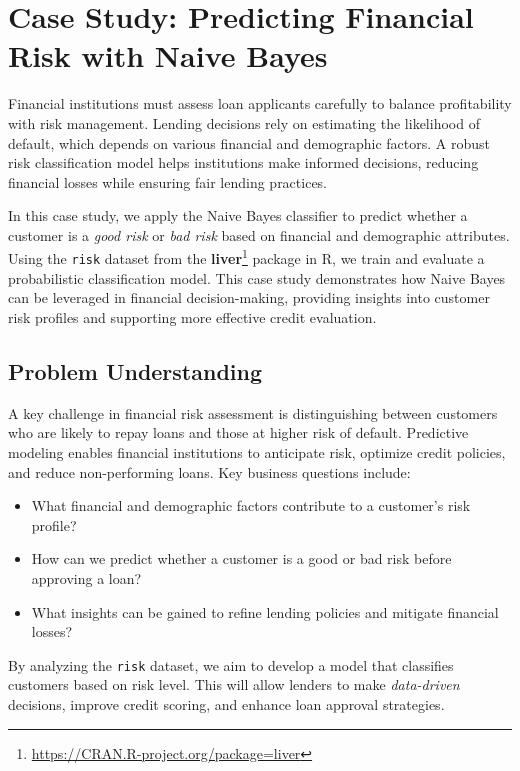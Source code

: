 \documentclass[
  11pt,
]{book}
\providecommand{\tightlist}{%
  \setlength{\itemsep}{0pt}\setlength{\parskip}{0pt}}
\renewcommand{\href}[2]{#2\footnote{\url{#1}}}
\theoremstyle{definition}
\theoremstyle{definition}
\theoremstyle{definition}
\theoremstyle{definition}
\theoremstyle{remark}
\begin{document}
\section{Case Study: Predicting Financial Risk with Naive Bayes}\label{case-study-predicting-financial-risk-with-naive-bayes}

Financial institutions must assess loan applicants carefully to balance profitability with risk management. Lending decisions rely on estimating the likelihood of default, which depends on various financial and demographic factors. A robust risk classification model helps institutions make informed decisions, reducing financial losses while ensuring fair lending practices.

In this case study, we apply the Naive Bayes classifier to predict whether a customer is a \emph{good risk} or \emph{bad risk} based on financial and demographic attributes. Using the \texttt{risk} dataset from the \href{https://CRAN.R-project.org/package=liver}{\textbf{liver}} package in R, we train and evaluate a probabilistic classification model. This case study demonstrates how Naive Bayes can be leveraged in financial decision-making, providing insights into customer risk profiles and supporting more effective credit evaluation.

\subsection*{Problem Understanding}\label{problem-understanding-2}


A key challenge in financial risk assessment is distinguishing between customers who are likely to repay loans and those at higher risk of default. Predictive modeling enables financial institutions to anticipate risk, optimize credit policies, and reduce non-performing loans. Key business questions include:

\begin{itemize}
\tightlist
\item
  What financial and demographic factors contribute to a customer's risk profile?\\
\item
  How can we predict whether a customer is a good or bad risk before approving a loan?\\
\item
  What insights can be gained to refine lending policies and mitigate financial losses?
\end{itemize}

By analyzing the \texttt{risk} dataset, we aim to develop a model that classifies customers based on risk level. This will allow lenders to make \emph{data-driven} decisions, improve credit scoring, and enhance loan approval strategies.
\end{document}
